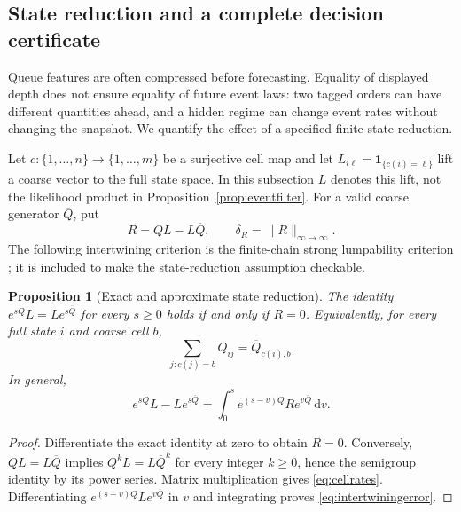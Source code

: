 \documentclass[11pt]{article}
\theoremstyle{plain}
\newtheorem{proposition}[theorem]{Proposition}
\theoremstyle{definition}
\theoremstyle{remark}
\newcommand{\dd}{\,\mathrm d}
\newcommand{\norm}[1]{\lVert#1\rVert}
\begin{document}
\subsection{State reduction and a complete decision certificate}

Queue features are often compressed before forecasting. Equality of
displayed depth does not ensure equality of future event laws: two
tagged orders can have different quantities ahead, and a hidden regime
can change event rates without changing the snapshot. We quantify
the effect of a specified finite state reduction.

Let \(c:\{1,\ldots,n\}\to\{1,\ldots,m\}\) be a surjective cell map
and let \(L_{i\ell}=\mathbf1_{\{c(i)=\ell\}}\) lift a coarse vector
to the full state space. In this subsection \(L\) denotes this lift,
not the likelihood product in Proposition~\ref{prop:eventfilter}.
For a valid coarse generator \(\overline Q\), put
\begin{equation}\label{eq:lumpresidual}
 R=QL-L\overline Q,\qquad
 \delta_R=\norm{R}_{\infty\to\infty}.
\end{equation}
The following intertwining criterion is the finite-chain strong
lumpability criterion \citep{Buchholz1994}; it is included to make
the state-reduction assumption checkable.

\begin{proposition}[Exact and approximate state reduction]
\label{prop:aggregation}
The identity \(e^{sQ}L=Le^{s\overline Q}\) for every \(s\ge0\)
holds if and only if \(R=0\). Equivalently, for every full state
\(i\) and coarse cell \(b\),
\begin{equation}\label{eq:cellrates}
 \sum_{j:c(j)=b}Q_{ij}=\overline Q_{c(i),b}.
\end{equation}
In general,
\begin{equation}\label{eq:intertwiningerror}
 e^{sQ}L-Le^{s\overline Q}
 =\int_0^s e^{(s-v)Q}R e^{v\overline Q}\dd v.
\end{equation}
\end{proposition}
\begin{proof}
Differentiate the exact identity at zero to obtain \(R=0\).
Conversely, \(QL=L\overline Q\) implies
\(Q^kL=L\overline Q^k\) for every integer \(k\ge0\), hence the
semigroup identity by its power series. Matrix multiplication gives
\eqref{eq:cellrates}. Differentiating
\(e^{(s-v)Q}Le^{v\overline Q}\) in \(v\) and integrating proves
\eqref{eq:intertwiningerror}.
\end{proof}
\end{document}
